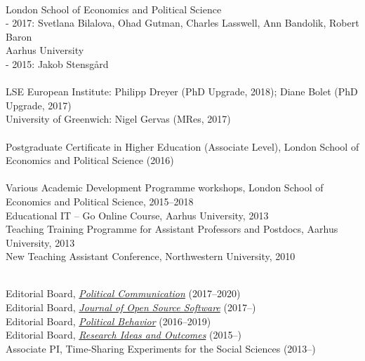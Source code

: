 \documentclass[12pt]{article}
\renewcommand{\section}[1]{\pagebreak[3]%
    \llap{\scshape\smash{\parbox[t]{\marginparwidth}{\raggedright {\color{lg}#1}}}}%
    \vspace{-\baselineskip}\par}
\newcommand{\topic}[1]{\pagebreak[3]\indent {\color{lg}{\footnotesize #1 }}\\}
\newcommand{\entry}[1]{\indent {\color{lg}\guillemotright}\hspace{2pt}#1\vspace{.25em}\\}
\newcommand{\subentry}[1]{{\color{lg}-} #1\vspace{.25em}\\}
\begin{document}
{\topic{Master Thesis Supervision}
	\entry{London School of Economics and Political Science}
        \subentry{2017: Svetlana Bilalova, Ohad Gutman, Charles Lasswell, Ann Bandolik, Robert Baron}
	\entry{Aarhus University}
		\subentry{2015: Jakob Stensg{\aa}rd}

\topic{External Examining}
    \entry{LSE European Institute: Philipp Dreyer (PhD Upgrade, 2018); Diane Bolet (PhD Upgrade, 2017)}
    \entry{University of Greenwich: Nigel Gervas (MRes, 2017)}

\topic{Pedagogical Qualifications}
    \entry{Postgraduate Certificate in Higher Education (Associate Level), London School of Economics and Political Science (2016)}
	
\topic{Pedagogical Training}
	\entry{Various Academic Development Programme workshops, London School of Economics and Political Science, 2015--2018}
	\entry{Educational IT -- Go Online Course, Aarhus University, 2013}
	\entry{Teaching Training Programme for Assistant Professors and Postdocs, Aarhus University, 2013}
	\entry{New Teaching Assistant Conference, Northwestern University, 2010}

\section{Editing \&\\ Reviewing}
\topic{Editing}
	\entry{Editorial Board, \href{http://www.tandfonline.com/toc/upcp20/current}{\textit{Political Communication}} (2017--2020)}
    \entry{Editorial Board, \href{http://joss.theoj.org/}{\textit{Journal of Open Source Software}} (2017--)}
    \entry{Editorial Board, \href{http://link.springer.com/journal/11109}{\textit{Political Behavior}} (2016--2019)}
	\entry{Editorial Board, \href{http://riojournal.com/}{\textit{Research Ideas and Outcomes}} (2015--)}
	\entry{Associate PI, Time-Sharing Experiments for the Social Sciences (2013--)}

}
\end{document}
